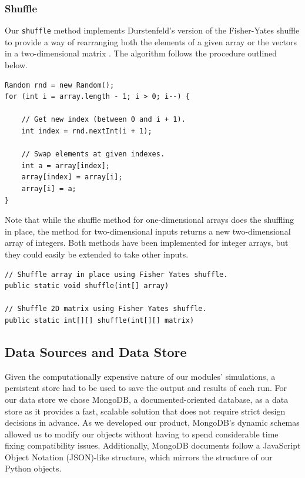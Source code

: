 \documentclass[a4paper,11pt]{article}
\begin{document}
\subsubsection{Shuffle}

Our \texttt{shuffle} method implements Durstenfeld's version of the Fisher-Yates shuffle to provide a way of rearranging both the elements of a given array or the vectors in a two-dimensional matrix \cite{Durstenfeld1964}. The algorithm follows the procedure outlined below.

\begin{verbatim}
Random rnd = new Random();
for (int i = array.length - 1; i > 0; i--) {

	// Get new index (between 0 and i + 1).
	int index = rnd.nextInt(i + 1);

	// Swap elements at given indexes.
	int a = array[index];
	array[index] = array[i];
	array[i] = a;
}
\end{verbatim}

Note that while the shuffle method for one-dimensional arrays does the shuffling in place, the method for two-dimensional inputs returns a new two-dimensional array of integers. Both methods have been implemented for integer arrays, but they could easily be extended to take other inputs. 

\begin{verbatim}
// Shuffle array in place using Fisher Yates shuffle.
public static void shuffle(int[] array)

// Shuffle 2D matrix using Fisher Yates shuffle.
public static int[][] shuffle(int[][] matrix)
\end{verbatim}

\subsection{Data Sources and Data Store}

Given the computationally expensive nature of our modules' simulations, a persistent store had to be used to save the output and results of each run. For our data store we chose MongoDB, a documented-oriented database, as a data store as it provides a fast, scalable solution that does not require strict design decisions in advance. As we developed our product, MongoDB's dynamic schemas allowed us to modify our objects without having to spend considerable time fixing compatibility issues. Additionally, MongoDB documents follow a JavaScript Object Notation (JSON)-like structure, which mirrors the structure of our Python objects.
\end{document}
